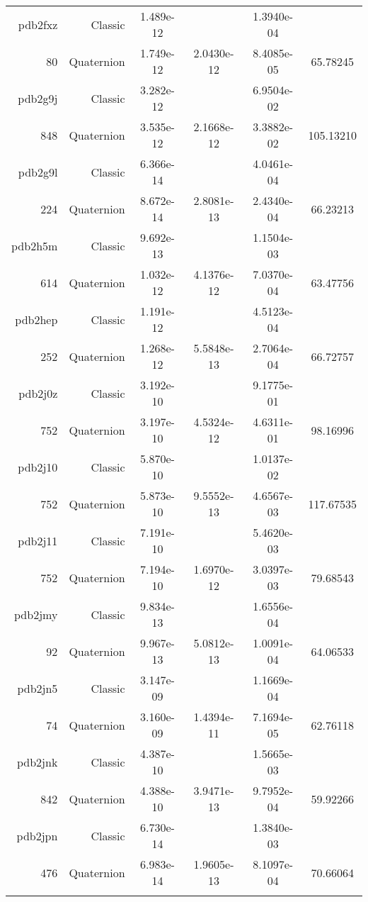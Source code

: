 \begin{xltabular}{\textwidth}{r|rS[table-format=1.3e+2]S[table-format=1.4e+2]S[table-format=1.4e+2]S[table-format=-1.5]}
pdb2fxz & Classic & 1.489e-12 &  & 1.3940e-04 & \\
80 & Quaternion & 1.749e-12 & 2.0430e-12 & 8.4085e-05 & 65.78245\\  \addlinespace
pdb2g9j & Classic & 3.282e-12 &  & 6.9504e-02 & \\
848 & Quaternion & 3.535e-12 & 2.1668e-12 & 3.3882e-02 & 105.13210\\  \addlinespace
pdb2g9l & Classic & 6.366e-14 &  & 4.0461e-04 & \\
224 & Quaternion & 8.672e-14 & 2.8081e-13 & 2.4340e-04 & 66.23213\\  \addlinespace
pdb2h5m & Classic & 9.692e-13 &  & 1.1504e-03 & \\
614 & Quaternion & 1.032e-12 & 4.1376e-12 & 7.0370e-04 & 63.47756\\  \addlinespace
pdb2hep & Classic & 1.191e-12 &  & 4.5123e-04 & \\
252 & Quaternion & 1.268e-12 & 5.5848e-13 & 2.7064e-04 & 66.72757\\  \addlinespace
pdb2j0z & Classic & 3.192e-10 &  & 9.1775e-01 & \\
752 & Quaternion & 3.197e-10 & 4.5324e-12 & 4.6311e-01 & 98.16996\\  \addlinespace
pdb2j10 & Classic & 5.870e-10 &  & 1.0137e-02 & \\
752 & Quaternion & 5.873e-10 & 9.5552e-13 & 4.6567e-03 & 117.67535\\  \addlinespace
pdb2j11 & Classic & 7.191e-10 &  & 5.4620e-03 & \\
752 & Quaternion & 7.194e-10 & 1.6970e-12 & 3.0397e-03 & 79.68543\\  \addlinespace
pdb2jmy & Classic & 9.834e-13 &  & 1.6556e-04 & \\
92 & Quaternion & 9.967e-13 & 5.0812e-13 & 1.0091e-04 & 64.06533\\  \addlinespace
pdb2jn5 & Classic & 3.147e-09 &  & 1.1669e-04 & \\
74 & Quaternion & 3.160e-09 & 1.4394e-11 & 7.1694e-05 & 62.76118\\  \addlinespace
pdb2jnk & Classic & 4.387e-10 &  & 1.5665e-03 & \\
842 & Quaternion & 4.388e-10 & 3.9471e-13 & 9.7952e-04 & 59.92266\\  \addlinespace
pdb2jpn & Classic & 6.730e-14 &  & 1.3840e-03 & \\
476 & Quaternion & 6.983e-14 & 1.9605e-13 & 8.1097e-04 & 70.66064\\  \addlinespace

\end{xltabular}
